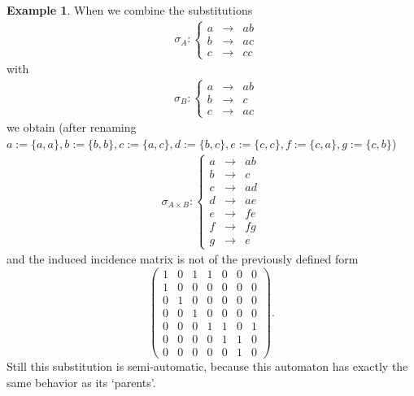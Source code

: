 \documentclass{article}
\theoremstyle{definition}
\newtheorem{example}[theorem]{Example}
\begin{document}
\begin{example} \label{ex:notclear}
When we combine the substitutions
\begin{eqnarray*}
\;\;\;
\sigma_A: \left\{ \begin{array}{lll}
a &\rightarrow& ab\\
b &\rightarrow& ac\\
c &\rightarrow& cc
\end{array} \right.
\end{eqnarray*}
with
\begin{eqnarray*}
\;\;\;
\sigma_B: \left\{ \begin{array}{lll}
a &\rightarrow& ab\\
b &\rightarrow& c\\
c &\rightarrow& ac
\end{array} \right.
\end{eqnarray*}
we obtain (after renaming $a := \{a, a\}, b := \{b, b\}, c := \{a, c\},
d := \{b, c\}, e := \{c, c\}, f := \{c, a\}, g := \{c, b\}$)
\begin{eqnarray*}
\sigma_{A \times B}: \left\{ \begin{array}{lll}
a &\rightarrow& ab\\
b &\rightarrow& c\\
c &\rightarrow& ad\\
d &\rightarrow& ae\\
e &\rightarrow& fe\\
f &\rightarrow& fg\\
g &\rightarrow& e
\end{array} \right.
\end{eqnarray*}
and the induced incidence matrix is not of the previously defined form
\begin{displaymath} \left( \begin{array}{ccccccc}
1 & 0 & 1 & 1 & 0 & 0 & 0 \\
1 & 0 & 0 & 0 & 0 & 0 & 0 \\
0 & 1 & 0 & 0 & 0 & 0 & 0 \\
0 & 0 & 1 & 0 & 0 & 0 & 0 \\
0 & 0 & 0 & 1 & 1 & 0 & 1 \\
0 & 0 & 0 & 0 & 1 & 1 & 0 \\
0 & 0 & 0 & 0 & 0 & 1 & 0 
\end{array} \right). \end{displaymath}
Still this substitution is semi-automatic, because this automaton has exactly 
the same behavior as its `parents'.
\end{example}
\end{document}
